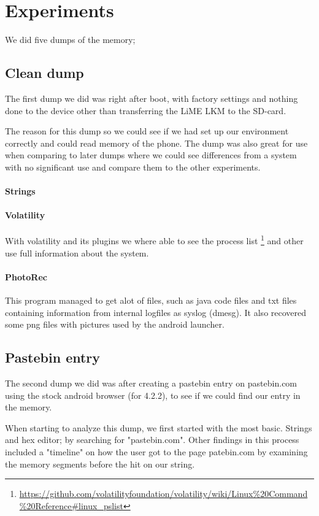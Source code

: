 \section{Experiments}
We did five dumps of the memory;
  \subsection{Clean dump}
  The first dump we did was right after boot, with factory settings and nothing done to the device 
  other than transferring the LiME LKM to the SD-card.
  
    The reason for this dump so we could see if we had set up our environment 
correctly and could read memory of the phone. The dump was also great for use 
when comparing to later dumps where we could see differences from a system with 
no significant use and compare them to the other experiments.

  \paragraph{Strings}

  \paragraph{Volatility}
  With volatility and its plugins we where able to see the process list
  \footnote{\url{https://github.com/volatilityfoundation/volatility/wiki/Linux\%20Command\%20Reference\#linux\_pslist}} 
  and other use full information about the system.

  \paragraph{PhotoRec}
  This program managed to get alot of files, such as java code files and txt 
  files containing information from internal logfiles as syslog (dmesg). It also 
  recovered some png files with pictures used by the android launcher.
  
  \subsection{Pastebin entry}
  The second dump we did was after creating a pastebin entry on pastebin.com using 
  the stock android browser (for 4.2.2),
  to see if we could find our entry in the memory.
  
  
  When starting to analyze this dump, we first started with the most basic. 
  Strings and hex editor; by searching for "pastebin.com". Other findings in this 
  process included a "timeline" on how the user got to the page patebin.com by 
  examining the memory segments before the hit on our string.

